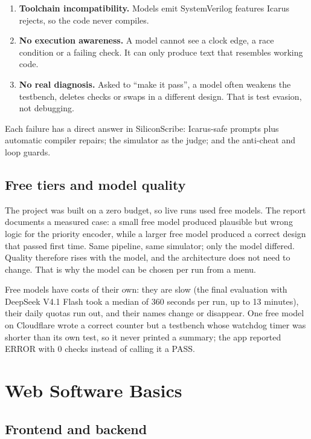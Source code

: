 \begin{enumerate}
  \item \textbf{Toolchain incompatibility.} Models emit SystemVerilog features Icarus rejects, so the code never compiles.
  \item \textbf{No execution awareness.} A model cannot see a clock edge, a race condition or a failing check. It can only produce text that resembles working code.
  \item \textbf{No real diagnosis.} Asked to ``make it pass'', a model often weakens the testbench, deletes checks or swaps in a different design. That is test evasion, not debugging.
\end{enumerate}

Each failure has a direct answer in SiliconScribe: Icarus-safe prompts plus automatic compiler repairs; the simulator as the judge; and the anti-cheat and loop guards.

\section{Free tiers and model quality}

The project was built on a zero budget, so live runs used free models. The report documents a measured case: a small free model produced plausible but wrong logic for the priority encoder, while a larger free model produced a correct design that passed first time. Same pipeline, same simulator; only the model differed. Quality therefore rises with the model, and the architecture does not need to change. That is why the model can be chosen per run from a menu.

Free models have costs of their own: they are slow (the final evaluation with DeepSeek V4.1 Flash took a median of 360 seconds per run, up to 13 minutes), their daily quotas run out, and their names change or disappear. One free model on Cloudflare wrote a correct counter but a testbench whose watchdog timer was shorter than its own test, so it never printed a summary; the app reported ERROR with 0 checks instead of calling it a PASS.

\chapter{Web Software Basics}
\label{ch:web}

\section{Frontend and backend}

